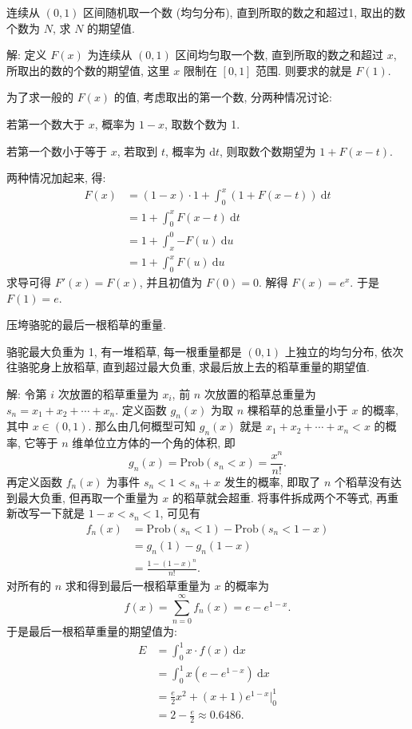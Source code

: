 连续从 $ (0,1) $ 区间随机取一个数 (均匀分布), 直到所取的数之和超过1, 取出的数个数为 $ N $, 求 $ N $ 的期望值.

解: 定义 $F(x)$ 为连续从 $ (0,1) $ 区间均匀取一个数, 直到所取的数之和超过 $x$, 所取出的数的个数的期望值, 这里 $x$ 限制在 $[0,1]$ 范围. 则要求的就是 $F(1)$. 

为了求一般的 $F(x)$ 的值, 考虑取出的第一个数, 分两种情况讨论: 

若第一个数大于 $x$, 概率为 $1-x$, 取数个数为 1.

若第一个数小于等于 $x$, 若取到 $t$, 概率为 $\mathrm{d}t$, 则取数个数期望为 $1 + F(x-t)$.

两种情况加起来, 得:
\begin{align*}
F(x) &= (1-x)\cdot 1 + \int_0^x{(1+F(x-t))}\ \mathrm{d}t \\
&= 1 + \int_0^x{F(x-t)}\ \mathrm{d}t \\
&= 1 + \int_x^0{-F(u)}\ \mathrm{d}u \\
&= 1 + \int_0^x{F(u)}\ \mathrm{d}u
\end{align*}
求导可得 $F'(x) = F(x)$, 并且初值为 $F(0) = 0$. 解得 $F(x) = e^x$. 于是 $F(1) = e$.


\newpage
\noindent 压垮骆驼的最后一根稻草的重量.

骆驼最大负重为 1, 有一堆稻草, 每一根重量都是 $(0,1)$ 上独立的均匀分布, 依次往骆驼身上放稻草, 直到超过最大负重, 求最后放上去的稻草重量的期望值.

解: 令第 $i$ 次放置的稻草重量为 $x_i$, 前 $n$ 次放置的稻草总重量为 $s_n = x_1+x_2+\cdots+x_n$. 定义函数 $g_n(x)$ 为取 $n$ 棵稻草的总重量小于 $x$ 的概率, 其中 $x\in(0,1)$. 那么由几何概型可知 $g_n(x)$ 就是 $x_1+x_2+\cdots+x_n < x$ 的概率, 它等于 $n$ 维单位立方体的一个角的体积, 即
\[g_n(x) = \mathrm{Prob}(s_n < x) = \frac{x^n}{n!} .\]
再定义函数 $f_n(x)$ 为事件 $s_n < 1 < s_n + x$ 发生的概率, 即取了 $n$ 个稻草没有达到最大负重, 但再取一个重量为 $x$ 的稻草就会超重. 将事件拆成两个不等式, 再重新改写一下就是 $1-x < s_n < 1$, 可见有
\begin{align*}
f_n(x) &= \mathrm{Prob}(s_n<1) - \mathrm{Prob}(s_n<1-x) \\
&= g_n(1) - g_n(1-x) \\
&= \frac{1-(1-x)^n}{n!} .
\end{align*}
对所有的 $n$ 求和得到最后一根稻草重量为 $x$ 的概率为
\[f(x) = \sum_{n=0}^{\infty}{f_n(x)} = e - e^{1-x} .\]
于是最后一根稻草重量的期望值为:
\begin{align*}
E &= \int_0^1 x\cdot f(x)\ \mathrm{d}x \\
&= \int_0^1 x(e-e^{1-x})\ \mathrm{d}x \\
&= \frac{e}{2}x^2+(x+1)e^{1-x}\bigg|_0^1 \\
&= 2 - \frac{e}{2} \approx 0.6486.
\end{align*}

